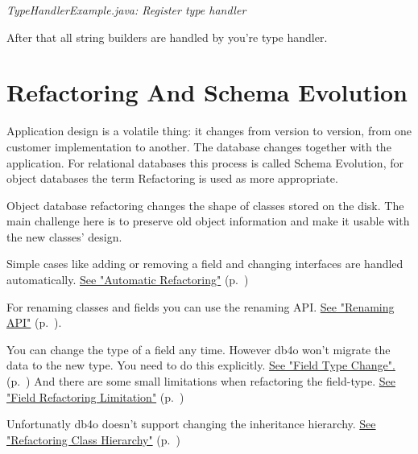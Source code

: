 {\small\itshape TypeHandlerExample.java: Register type handler\par}
\medskip

After that all string builders are handled by you're type handler.

\section{Refactoring And Schema Evolution}
\label{ref:advanced-topics-refactoring-and-schema-evolution}

Application design is a volatile thing: it changes from version to version, from one customer implementation to another. The database changes together with the application. For relational databases this process is called Schema Evolution, for object databases the term Refactoring is used as more appropriate.

Object database refactoring changes the shape of classes stored on the disk. The main challenge here is to preserve old object information and make it usable with the new classes' design.

Simple cases like adding or removing a field and changing interfaces are handled automatically. \hyperref[ref:advanced-topics-refactoring-and-schema-evolution-automatic-refactoring]{See "Automatic Refactoring"} (p.~\pageref{ref:advanced-topics-refactoring-and-schema-evolution-automatic-refactoring})

For renaming classes and fields you can use the renaming API. \hyperref[ref:advanced-topics-refactoring-and-schema-evolution-refactoring-api]{See "Renaming API"} (p.~\pageref{ref:advanced-topics-refactoring-and-schema-evolution-refactoring-api}).

You can change the type of a field any time. However db4o won't migrate the data to the new type. You need to do this explicitly. \hyperref[ref:advanced-topics-refactoring-and-schema-evolution-field-type-change]{See "Field Type Change".} (p.~\pageref{ref:advanced-topics-refactoring-and-schema-evolution-field-type-change}) And there are some small limitations when refactoring the field-type. \hyperref[ref:advanced-topics-refactoring-and-schema-evolution-field-refactoring-limitation]{See "Field Refactoring Limitation"} (p.~\pageref{ref:advanced-topics-refactoring-and-schema-evolution-field-refactoring-limitation})

Unfortunatly db4o doesn't support changing the inheritance hierarchy. \hyperref[ref:advanced-topics-refactoring-and-schema-evolution-refactoring-class-hierarchy]{See "Refactoring Class Hierarchy"} (p.~\pageref{ref:advanced-topics-refactoring-and-schema-evolution-refactoring-class-hierarchy})


